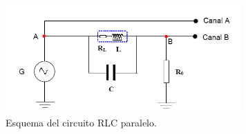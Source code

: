 \documentclass[laboratorio]{guia}
\begin{document}
\begin{figure}[t!]
    \centering
    \includegraphics[width=9cm]{LG06--001.png}
    \caption{Esquema del circuito RLC paralelo.}
    \label{fig:circuitoRLCparalelo}
\end{figure}

\nocite{Alonso1998,Crawford1994,Purcell1988,Reitz1996,Trelles1984,Reitz1996}
 

\end{document}

